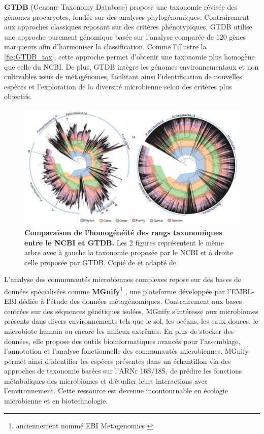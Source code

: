 \textbf{GTDB} (Genome Taxonomy Database) \cite{parks_standardized_2018} propose une taxonomie révisée des génomes procaryotes, fondée sur des analyses phylogénomiques. Contrairement aux approches classiques reposant sur des critères phénotypiques, GTDB utilise une approche purement génomique basée sur l'analyse comparée de 120 gènes marqueurs afin d’harmoniser la classification. Comme l’illustre la \autoref{fig:GTDB_tax}, cette approche permet d’obtenir une taxonomie plus homogène que celle du NCBI. De plus, GTDB intègre les génomes environnementaux et non cultivables issus de métagénomes, facilitant ainsi l’identification de nouvelles espèces et l’exploration de la diversité microbienne selon des critères plus objectifs.

\begin{figure}
    \centering
    \includegraphics[width=.75\linewidth]{images/GTDB_taxonomie.png}
    \caption[Comparaison de l'homogénéité des rangs taxonomiques entre le NCBI et GTDB]{\textbf{Comparaison de l'homogénéité des rangs taxonomiques entre le NCBI et GTDB.} Les 2 figures représentent le même arbre avec à gauche la taxonomie proposée par le NCBI et à droite celle proposée par GTDB. Copié de \cite{gautreau_conceptualisation_2020} et adapté de \cite{parks_standardized_2018}}
    \label{fig:GTDB_tax}
\end{figure}

L’analyse des communautés microbiennes complexes repose sur des bases de données spécialisées comme \textbf{MGnify}\footnote{anciennement nommé EBI Metagenomics \cite{hunter_ebi_2014}} \cite{richardson_mgnify_2023}, une plateforme développée par l’EMBL-EBI dédiée à l’étude des données métagénomiques. Contrairement aux bases centrées sur des séquences génétiques isolées, MGnify s’intéresse aux microbiomes présents dans divers environnements tels que le sol, les océans, les eaux douces, le microbiote humain ou encore les milieux extrêmes. En plus de stocker des données, elle propose des outils bioinformatiques avancés pour l’assemblage, l’annotation et l’analyse fonctionnelle des communautés microbiennes. MGnify permet ainsi d’identifier les espèces présentes dans un échantillon via des approches de taxonomie basées sur l’ARNr 16S/18S, de prédire les fonctions métaboliques des microbiomes et d’étudier leurs interactions avec l’environnement. Cette ressource est devenue incontournable en écologie microbienne et en biotechnologie.

